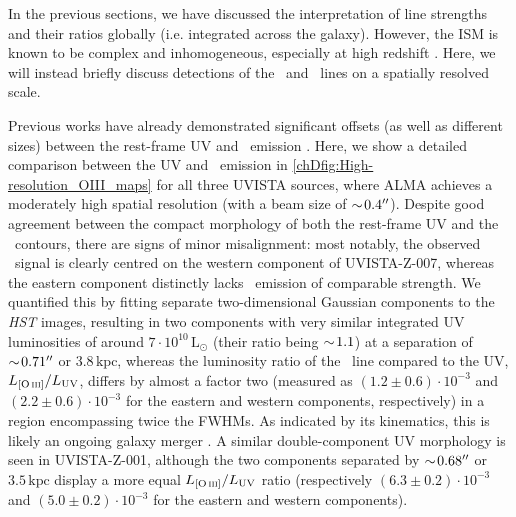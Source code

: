 In the previous sections, we have discussed the interpretation of line strengths and their ratios globally (i.e. integrated across the galaxy). However, the ISM is known to be complex and inhomogeneous, especially at high redshift \citep{2021MNRAS.505.5543V, 2022MNRAS.513.5621P}. Here, we will instead briefly discuss detections of the \CIILam\ and \OIIILam\ lines on a spatially resolved scale.

Previous works have already demonstrated significant offsets (as well as different sizes) between the rest-frame UV and \CIILam\ emission \citep[e.g.][]{2015MNRAS.452...54M, 2018MNRAS.478.1170C, 2018ApJ...854L...7C}. Here, we show a detailed comparison between the UV and \OIIILam\ emission in \cref{chDfig:High-resolution_OIII_maps} for all three UVISTA sources, where ALMA achieves a moderately high spatial resolution (with a beam size of $\sim \! 0.4 \hbox{$^{\prime\prime}$}$). Despite good agreement between the compact morphology of both the rest-frame UV and the \OIIIf\ contours, there are signs of minor misalignment: most notably, the observed \OIIIf\ signal is clearly centred on the western component of UVISTA-Z-007, whereas the eastern component distinctly lacks \OIIIf\ emission of comparable strength. We quantified this by fitting separate two-dimensional Gaussian components to the \textit{HST} images, resulting in two components with very similar integrated UV luminosities of around $7 \cdot 10^{10} \, \mathrm{L_\odot}$ (their ratio being $\sim \! 1.1$) at a separation of $\sim \! 0.71 \hbox{$^{\prime\prime}$}$ or $3.8 \, \mathrm{kpc}$, whereas the luminosity ratio of the \OIIILam\ line compared to the UV, $L_\OIIIf/L_\text{UV}$, differs by almost a factor two (measured as $(1.2 \pm 0.6) \cdot 10^{-3}$ and $(2.2 \pm 0.6) \cdot 10^{-3}$ for the eastern and western components, respectively) in a region encompassing twice the FWHMs. As indicated by its kinematics, this is likely an ongoing galaxy merger \citep{2022arXiv220204080S}. A similar double-component UV morphology is seen in UVISTA-Z-001, although the two components separated by $\sim \! 0.68 \hbox{$^{\prime\prime}$}$ or $3.5 \, \mathrm{kpc}$ display a more equal $L_\OIIIf/L_\text{UV}$ ratio (respectively $(6.3 \pm 0.2) \cdot 10^{-3}$ and $(5.0 \pm 0.2) \cdot 10^{-3}$ for the eastern and western components).

